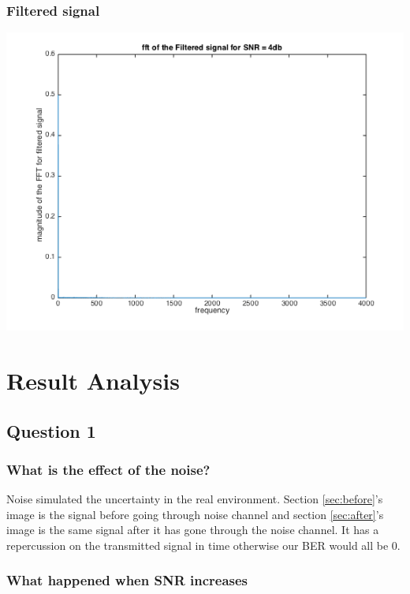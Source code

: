 \documentclass[11pt]{scrartcl}
\begin{document}
\subsubsection{Filtered signal}
\begin{minipage}[t]{\linewidth}
{
\includegraphics[scale = 0.6]{filtered_signal_fft.png}
}
\end{minipage}
\medskip

\section{Result Analysis}

\subsection{Question 1}
\subsubsection{What is the effect of the noise?}
Noise simulated the uncertainty in the real environment. Section \ref{sec:before}'s image is the signal before going through noise channel and section \ref{sec:after}'s image is the same signal after it has gone through the noise channel. It has a repercussion on the transmitted signal in time otherwise our BER would all be 0.

\subsubsection{What happened when SNR increases}
\end{document}
